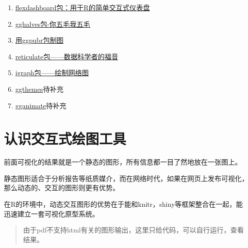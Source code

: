\documentclass[
]{book}
\begin{document}
\begin{enumerate}
\item
  \href{http://mp.weixin.qq.com/s?__biz=MzI1NjUwMjQxMQ==\&mid=2247486237\&idx=1\&sn=571544510c7e3e48a280dd4d677656e5\&chksm=ea24f4f9dd537defa493c419973f75943159316765ac61093a195b83fde314dd7fffe61349cd\&scene=21\#wechat_redirect}{flexdashboard包：用于R的简单交互式仪表盘}
\item
  \href{http://mp.weixin.qq.com/s?__biz=MzI1NjUwMjQxMQ==\&mid=2247486214\&idx=1\&sn=7ff5d7375c615d20cffea6329cccff37\&chksm=ea24f4e2dd537df4a5ebe66a441b2fb0ee0599a05a700e1d199f729c497a68857e8031cd2e61\&scene=21\#wechat_redirect}{gghalves包-你五毛我五毛}
\item
  \href{http://mp.weixin.qq.com/s?__biz=MzI1NjUwMjQxMQ==\&mid=2247485615\&idx=1\&sn=47ac21f131bf2ac6c90c50fb9fb7966b\&chksm=ea24f74bdd537e5d74f60919388f683dfe779fe8a2d11999e55e290d4bdb25c64e36cc74ccc1\&scene=21\#wechat_redirect}{用ggpubr包制图}
\item
  \href{http://mp.weixin.qq.com/s?__biz=MzI1NjUwMjQxMQ==\&mid=2247484515\&idx=1\&sn=26b03b6ad26f2315cdc04049f740f1c0\&chksm=ea24fb87dd537291d5184c28a9c9f2cdda591e4c17a7e7daaff34a9a1c3949ee0e86f9b355b7\&scene=21\#wechat_redirect}{reticulate包------数据科学者的福音}
\item
  \href{http://mp.weixin.qq.com/s?__biz=MzI1NjUwMjQxMQ==\&mid=2247483780\&idx=1\&sn=46ce562ed91ec2d08d7669477160c249\&chksm=ea24fe60dd53777615de14ec0ad087c1bbc56d46d73eb51e13fdeeaa60633063b4bd415a7d01\&scene=21\#wechat_redirect}{igraph包------绘制网络图}
\item
  \href{https://github.com/jrnold/ggthemes}{ggthemes}待补充
\item
  \href{https://gganimate.com/}{gganimate}待补充
\end{enumerate}

\hypertarget{interactive-ploting}{%
\chapter{认识交互式绘图工具}\label{interactive-ploting}}

前面可视化的结果就是一个静态的图形，所有信息都一目了然地放在一张图上。

静态图形适合于分析报告等纸质媒介，而在网络时代，如果在网页上发布可视化，那么动态的、交互的图形则更有优势。

在R的环境中，动态交互图形的优势在于能和knitr，shiny等框架整合在一起，能迅速建立一套可视化原型系统。

\begin{quote}
由于pdf不支持html有关的图形输出，这里只给代码，可以自行运行，查看结果。
\end{quote}
\end{document}
